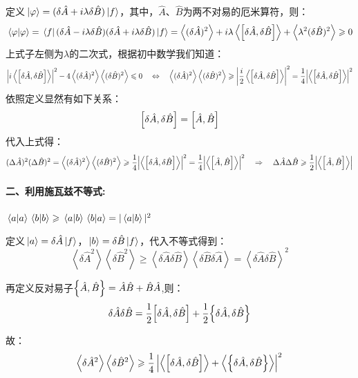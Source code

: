 定义$\ket*{\varphi}=(\delta\hat{A}+i\lambda \delta\hat{B})\ket*{f}$，其中，$\hat{A}$、$\hat{B}$为两不对易的厄米算符，则：
\[\bra*{\varphi}\ket*{\varphi}=\bra*{f}(\delta\hat{A}-i\lambda \delta\hat{B})(\delta\hat{A}+i\lambda \delta\hat{B})\ket*{f} = \left \langle (\delta\hat{A})^2 \right \rangle+i\lambda\left \langle \comm{\delta\hat{A}}{\delta\hat{B}} \right \rangle+\left \langle \lambda^2(\delta\hat{B})^2 \right \rangle \geqslant 0\]
上式子左侧为$\lambda$的二次式，根据初中数学我们知道：
\[\left |i\left \langle \comm{\delta\hat{A}}{\delta\hat{B}} \right \rangle\right |^2-4\left \langle (\delta\hat{A})^2 \right \rangle\left \langle (\delta\hat{B})^2 \right \rangle \leqslant 0 \quad \Leftrightarrow \quad \left \langle (\delta\hat{A})^2 \right \rangle\left \langle (\delta\hat{B})^2 \right \rangle \geqslant \qty|\frac{i}{2}\left \langle \comm{\delta\hat{A}}{\delta\hat{B}} \right \rangle|^2=\frac{1}{4}\qty|\left \langle \comm{\delta\hat{A}}{\delta\hat{B}} \right \rangle|^2\]
依照定义显然有如下关系：
\[\comm{\delta\hat{A}}{\delta\hat{B}}=\comm{\hat{A}}{\hat{B}}\]
代入上式得：
\[(\Delta \hat{A})^2(\Delta \hat{B})^2 = \left \langle (\delta\hat{A})^2 \right \rangle\left \langle (\delta\hat{B})^2 \right \rangle \geqslant \frac{1}{4}\qty|\left \langle \comm{\delta\hat{A}}{\delta\hat{B}} \right \rangle|^2=\frac{1}{4}\qty|\left \langle \comm{\hat{A}}{\hat{B}} \right \rangle|^2 \quad \Rightarrow \quad \Delta \hat{A}\Delta \hat{B} \geqslant \frac{1}{2}\qty|\left \langle \comm{\hat{A}}{\hat{B}} \right \rangle|\]

\paragraph*{二、利用施瓦兹不等式:}$\bra*{a}\ket*{a}\bra*{b}\ket*{b} \geqslant \bra*{a}\ket*{b}\bra*{b}\ket*{a}=|\bra*{a}\ket*{b}|^2$

定义$\ket*{a}=\delta\hat{A}\ket*{f}$，$\ket*{b}=\delta\hat{B}\ket*{f}$，代入不等式得到：
\[\left \langle \delta\hat{A}^2 \right \rangle\left \langle \delta\hat{B}^2 \right \rangle \geqslant \left \langle \delta\hat{A}\delta\hat{B} \right \rangle\left \langle \delta\hat{B}\delta\hat{A} \right \rangle=\left \langle \delta\hat{A}\delta\hat{B} \right \rangle^2\]

再定义反对易子$\qty{\hat{A},\hat{B}}=\hat{A}\hat{B}+\hat{B}\hat{A}$,则：
\[\delta\hat{A}\delta\hat{B}=\frac{1}{2}\comm{\delta\hat{A}}{\delta\hat{B}}+\frac{1}{2}\qty{\delta\hat{A},\delta\hat{B}}\]

故：
\[\left \langle \delta\hat{A}^2 \right \rangle\left \langle \delta\hat{B}^2 \right \rangle \geqslant \frac{1}{4} \left | \left \langle \comm{\delta\hat{A}}{\delta\hat{B}} \right \rangle+\left \langle \qty{\delta\hat{A},\delta\hat{B}} \right \rangle \right |^2\]

